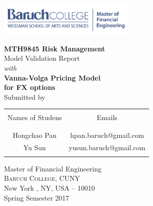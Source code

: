 \begin{titlepage}

\includegraphics[width=0.5\textwidth]{./MFE-Logo}\\[0.2in]

\begin{center}

\textup{\Large {\bf MTH9845 Risk Management} \\ [0.2in] Model Validation Report}\\[0.2in] \textit{with}\\[0.2in]

\Large \textbf {{Vanna-Volga Pricing Model }\\ for FX options} \\ [1in]



\normalsize Submitted by \\
\begin{table}[h]
\centering
\begin{tabular}{cc}\hline \\
Names of Studens & Emails \\ \\ \hline
\\
Hongchao Pan & hpan.baruch@gmail.com \\[0.1in]
Yu Sun & yusun.baruch@gmail.com \\ \\ \hline 
\end{tabular}
\end{table}

\vspace{.1in}

\vfill

\Large{Master of Financial Engineering}\\
\normalsize
\textsc{Baruch College, CUNY}\\
New York , NY, USA -- 10010 \\
\vspace{0.2cm}
Spring Semester 2017

\end{center}

\end{titlepage}
